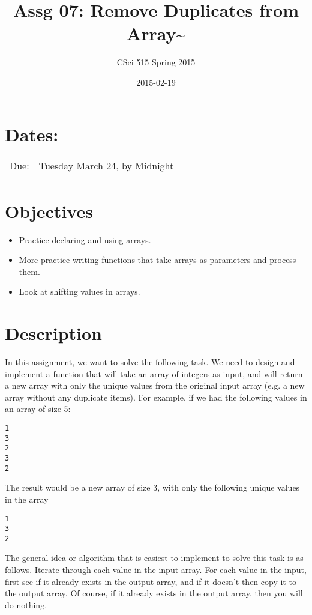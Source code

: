 \documentclass[11pt]{article}
\title{Assg 07: Remove Duplicates from Array\~{}}
\author{CSci 515 Spring 2015}
\date{2015-02-19}
\begin{document}
\maketitle


\section*{Dates:}
\label{sec-1}


\begin{center}
\begin{tabular}{ll}
 Due:  &  Tuesday March 24, by Midnight  \\
\end{tabular}
\end{center}
\section*{Objectives}
\label{sec-2}

\begin{itemize}
\item Practice declaring and using arrays.
\item More practice writing functions that take arrays as parameters and
  process them.
\item Look at shifting values in arrays.
\end{itemize}
\section*{Description}
\label{sec-3}

In this assignment, we want to solve the following task.  We need to design
and implement a function that will take an array of integers as input, and
will return a new array with only the unique values from the original
input array (e.g. a new array without any duplicate items).  For example,
if we had the following values in an array of size 5:


\begin{verbatim}
1
3
2
3
2
\end{verbatim}

The result would be a new array of size 3, with only the following unique
values in the array


\begin{verbatim}
1
3
2
\end{verbatim}

The general idea or algorithm that is easiest to implement to solve
this task is as follows.  Iterate through each value in the input
array.  For each value in the input, first see if it already exists in
the output array, and if it doesn't then copy it to the output array.
Of course, if it already exists in the output array, then you will do
nothing.
\end{document}
